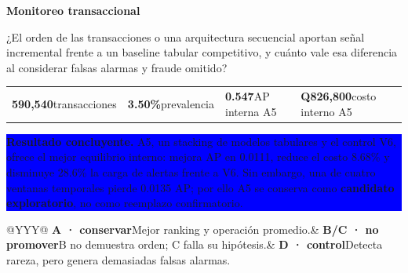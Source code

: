 \documentclass[10pt]{article}
\begin{document}
\begin{titlepage}\pagecolor{navy}\color{white}
\vspace*{.18cm}{\small\bfseries DEEP LEARNING Y SISTEMAS INTELIGENTES\hfill PROYECTO 1 · V7\par}
\vspace{.35cm}{\color{teal}\rule{\linewidth}{2.2pt}}\vspace{.55cm}
{\Huge\bfseries Monitoreo transaccional\par}\vspace{.12cm}{\LARGE Evidencia temporal, detección de fraude y decisión económica\par}
\vspace{.48cm}{\large\bfseries Pregunta ejecutiva\par}\vspace{3pt}
¿El orden de las transacciones o una arquitectura secuencial aportan señal incremental frente a un baseline tabular competitivo, y cuánto vale esa diferencia al considerar falsas alarmas y fraude omitido?

\vspace{.50cm}\begin{tabularx}{\linewidth}{@{}XXXX@{}}
\centering\textbf{590,540}\newline\scriptsize transacciones&
\centering\textbf{3.50\%}\newline\scriptsize prevalencia&
\centering\textbf{0.547}\newline\scriptsize AP interna A5&
\centering\textbf{Q826,800}\newline\scriptsize costo interno A5
\end{tabularx}

\vspace{.55cm}\colorbox{blue}{\parbox{\dimexpr\linewidth-2\fboxsep}{
\textbf{Resultado concluyente.} A5, un stacking de modelos tabulares y el control V6, ofrece el mejor equilibrio interno: mejora AP en 0.0111, reduce el costo 8.68\% y disminuye 28.6\% la carga de alertas frente a V6. Sin embargo, una de cuatro ventanas temporales pierde 0.0135 AP; por ello A5 se conserva como \textbf{candidato exploratorio}, no como reemplazo confirmatorio.
}}

\vspace{.35cm}\begin{tabularx}{\linewidth}{@{}YYY@{}}
\textbf{A · conservar}\newline\scriptsize Mejor ranking y operación promedio.&
\textbf{B/C · no promover}\newline\scriptsize B no demuestra orden; C falla su hipótesis.&
\textbf{D · control}\newline\scriptsize Detecta rareza, pero genera demasiadas falsas alarmas.
\end{tabularx}


\end{titlepage}
\end{document}
